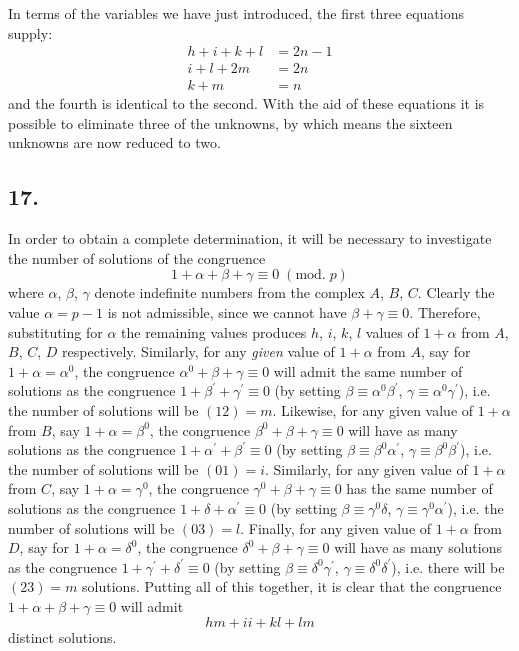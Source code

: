 \documentclass[twoside,12pt]{memoir}
\renewcommand{\pmod}[1]{\;(\textrm{mod.}\;#1)}
\begin{document}
In terms of the variables we have just introduced, the first three equations supply:
\[\begin{aligned}
h+i+k+l & =2n-1 \\
i+l+2m & =2n \\
k+m & =n
\end{aligned}\]
and the fourth is identical to the second.  With the aid of these equations it is possible to eliminate three of the unknowns, by which means the sixteen unknowns are now reduced to two.
%

\subsection*{17.}

In order to obtain a complete determination, it will be necessary to investigate the number of solutions of the congruence
\[1+\alpha+\beta+\gamma \equiv 0\pmod{p}\]
where \(\alpha\), \(\beta\), \(\gamma\) denote indefinite numbers from the complex \(A\), \(B\), \(C\). Clearly the value \(\alpha=p-1\) is not admissible, since we cannot have \(\beta+\gamma \equiv 0\). Therefore, substituting for \(\alpha\) the remaining values produces \(h\), \(i\), \(k\), \(l\) values of \(1+\alpha\) from \(A\), \(B\), \(C\), \(D\) respectively. Similarly, for any \textit{given} value of \(1+\alpha\) from \(A\), say for \(1+\alpha=\alpha^{0}\), the congruence \(\alpha^{0}+\beta+\gamma \equiv 0\) will admit the same number of solutions as the congruence \(1+\beta^{\prime}+\gamma^{\prime} \equiv 0\) (by setting \(\beta \equiv \alpha^{0} \beta^{\prime}\), \(\gamma \equiv \alpha^{0} \gamma^{\prime}\)), i{.}e{.} the number of solutions will be \((12)=m\). Likewise, for any given value of \(1+\alpha\) from \(B\), say \(1+\alpha=\beta^{0}\), the congruence \(\beta^{0}+\beta+\gamma \equiv 0\) will have as many solutions as the congruence \(1+\alpha^{\prime}+\beta^{\prime} \equiv 0\) (by setting \(\beta \equiv \beta^{0} \alpha^{\prime}\), \(\gamma \equiv \beta^{0} \beta^{\prime}\)), i{.}e{.} the number of solutions will be \((01)=i\). Similarly, for any given value of \(1+\alpha\) from \(C\), say \(1+\alpha=\gamma^{0}\), the congruence \(\gamma^{0}+\beta+\gamma \equiv 0\) has the same number of solutions as the congruence \(1+\delta+\alpha^{\prime} \equiv 0\) (by setting \(\beta \equiv \gamma^{0} \delta\), \(\gamma \equiv \gamma^{0} \alpha^{\prime}\)), i{.}e{.} the number of solutions will be \((03)=l\). Finally, for any given value of \(1+\alpha\) from \(D\), say for \(1+\alpha=\delta^{0}\), the congruence \(\delta^{0}+\beta+\gamma \equiv 0\) will have as many solutions as the congruence \(1+\gamma^{\prime}+\delta^{\prime} \equiv 0\) (by setting \(\beta \equiv \delta^{0} \gamma^{\prime}\), \(\gamma \equiv \delta^{0} \delta^{\prime}\)), i{.}e{.} there will be \((23)=m\) solutions. Putting all of this together, it is clear that the congruence \(1+\alpha+\beta+\gamma \equiv 0\) will admit
\[h m+i i+k l+l m\]
distinct solutions.
%
\end{document}
